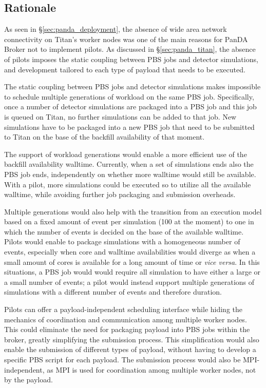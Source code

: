 
\subsection{Rationale}
As seen in \S\ref{sec:panda_deployment}, the absence of wide area network
connectivity on Titan's worker nodes was one of the main reasons for PanDA
Broker not to implement pilots. As discussed in \S\ref{sec:panda_titan}, the
absence of pilots imposes the static coupling between PBS jobs and detector
simulations, and development tailored to each type of payload that needs to be
executed.

The static coupling between PBS jobs and detector simulations makes impossible
to schedule multiple generations of workload on the same PBS job. Specifically,
once a number of detector simulations are packaged into a PBS job and this job
is queued on Titan, no further simulations can be added to that job. New
simulations have to be packaged into a new PBS job that need to be submitted to
Titan on the base of the backfill availability of that moment.

The support of workload generations would enable a more efficient use of the
backfill availability walltime. Currently, when a set of simulations ends also
the PBS job ends, independently on whether more walltime would still be
available. With a pilot, more simulations could be executed so to utilize all
the available walltime, while avoiding further job packaging and submission
overheads.

Multiple generations would also help with the transition from an execution model
based on a fixed amount of event per simulation (100 at the moment) to one in
which the number of events is decided on the base of the available walltime.
Pilots would enable to package simulations with a homogeneous number of events,
especially when core and walltime availabilities would diverge as when a small
amount of cores is available for a long amount of time or \textit{vice versa}.
In this situations, a PBS job would would require all simulation to have either
a large or a small number of events; a pilot would instead support multiple
generations of simulations with a different number of events and therefore
duration.

Pilots can offer a payload-independent scheduling interface while hiding the
mechanics of coordination and communication among multiple worker nodes. This
could eliminate the need for packaging payload into PBS jobs within the broker,
greatly simplifying the submission process. This simplification would also
enable the submission of different types of payload, without having to develop a
specific PBS script for each payload. The submission process would also be
MPI-independent, as MPI is used for coordination among multiple worker nodes,
not by the payload.

